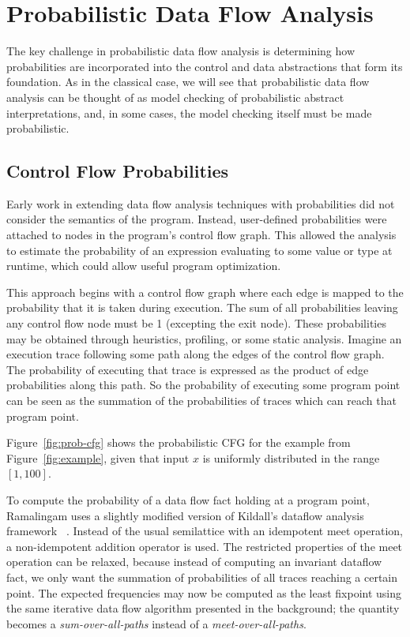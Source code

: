 \section{Probabilistic Data Flow Analysis}
\label{sec:pdfa}

The key challenge in probabilistic data flow analysis is
determining how probabilities are incorporated into the control
and data abstractions that form its foundation.
As in the classical case, we will see that probabilistic data flow analysis
can be thought of as model checking
of probabilistic abstract interpretations, and, in some
cases, the model checking itself must be made probabilistic.

\subsection{Control Flow Probabilities}
Early work in extending data flow analysis 
techniques with probabilities did not consider
the semantics of the program. 
Instead, user-defined probabilities 
were attached to nodes in the program's control flow graph.  
This allowed the analysis to estimate
the probability of an expression evaluating 
to some value or type at runtime, which could 
allow useful program optimization.

This approach begins with a control flow graph where each edge is 
mapped to the probability that it is taken during execution.
The sum of all probabilities leaving any control flow node must be 1
(excepting the exit node).
These probabilities may be obtained through heuristics, profiling,
or some static analysis.
Imagine an execution trace following some path along the edges of
the control flow graph.
The probability of executing that trace is expressed as the product of 
edge probabilities along this path.
So the probability of executing some program point can be seen as the
summation of the probabilities of traces which can reach that program point.


Figure~\ref{fig:prob-cfg} shows the probabilistic CFG for the
example from Figure~\ref{fig:example}, given that input $x$
is uniformly distributed in the range $[1,100]$.

To compute the probability of a data flow fact holding 
at a program point, Ramalingam uses a slightly
modified version of Kildall's dataflow analysis framework
~\cite{ramalingam1996data}.
Instead of the usual semilattice with an idempotent meet
operation, a non-idempotent addition operator is used.
The restricted properties of the meet operation can be
relaxed, because instead of computing an invariant dataflow
fact, we only want the summation of probabilities of all
traces reaching a certain point.
The expected frequencies may now be computed as the least
fixpoint using the same iterative data flow algorithm presented
in the background; the quantity becomes a
{\sl sum-over-all-paths} instead of a {\sl meet-over-all-paths}.

